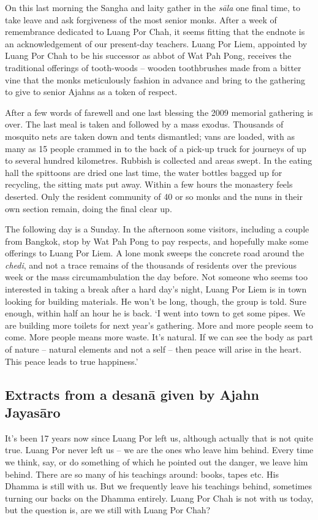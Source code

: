 On this last morning the Sangha and laity gather in the \emph{sāla} one
final time, to take leave and ask forgiveness of the most senior monks. 
After a week of remembrance dedicated to Luang Por Chah, it seems
fitting that the endnote is an acknowledgement of our present-day
teachers. Luang Por Liem, appointed by Luang Por Chah to be his
successor as abbot of Wat Pah Pong, receives the traditional offerings
of tooth-woods -- wooden toothbrushes made from a bitter vine that the
monks meticulously fashion in advance and bring to the gathering to give
to senior Ajahns as a token of respect. 

After a few words of farewell and one last blessing the 2009 memorial
gathering is over. The last meal is taken and followed by a mass exodus. 
Thousands of mosquito nets are taken down and tents dismantled; vans are
loaded, with as many as 15 people crammed in to the back of a
pick-up truck for journeys of up to several hundred kilometres. Rubbish
is collected and areas swept. In the eating hall the spittoons are dried
one last time, the water bottles bagged up for recycling, the sitting
mats put away. Within a few hours the monastery feels deserted. Only the
resident community of 40 or so monks and the nuns in their own
section remain, doing the final clear up. 

The following day is a Sunday. In the afternoon some visitors, including
a couple from Bangkok, stop by Wat Pah Pong to pay respects, and
hopefully make some offerings to Luang Por Liem. A lone monk sweeps the
concrete road around the \emph{chedi}, and not a trace remains of the
thousands of residents over the previous week or the mass
circumambulation the day before. Not someone who seems too interested in
taking a break after a hard day's night, Luang Por Liem is in town
looking for building materials. He won't be long, though, the group is
told. Sure enough, within half an hour he is back. `I went into town to
get some pipes. We are building more toilets for next year's gathering. 
More and more people seem to come. More people means more waste. It's
natural. If we can see the body as part of nature -- natural elements
and not a self -- then peace will arise in the heart. This peace leads
to true happiness.'

\subsection*{Extracts from a desanā given by Ajahn Jayasāro}

It's been 17 years now since Luang Por left us, although actually
that is not quite true. Luang Por never left us -- we are the ones who
leave him behind. Every time we think, say, or do something of which he
pointed out the danger, we leave him behind. There are so many of his
teachings around: books, tapes etc. His Dhamma is still with us. But we
frequently leave his teachings behind, sometimes turning our backs on
the Dhamma entirely. Luang Por Chah is not with us today, but the
question is, are we still with Luang Por Chah? 

